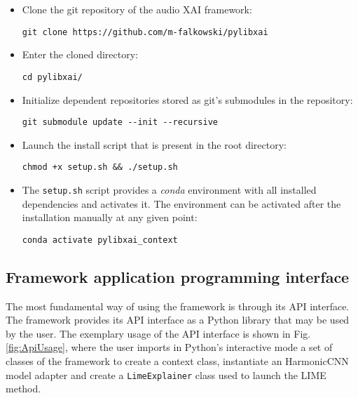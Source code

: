 \documentclass[
    bindingoffset=5mm,  %
    footnoteindent=3mm, %
    hyphenation=true    %
]{src/wut-thesis}
\begin{document}
\begin{itemize}
    \item Clone the git repository of the audio XAI framework:
\begin{verbatim}
git clone https://github.com/m-falkowski/pylibxai
\end{verbatim}
    \item Enter the cloned directory:
\begin{verbatim}
cd pylibxai/
\end{verbatim}
    \item Initialize dependent repositories stored as git's submodules in the repository:
\begin{verbatim}
git submodule update --init --recursive
\end{verbatim}
    \item Launch the install script that is present in the root directory:
\begin{verbatim}
chmod +x setup.sh && ./setup.sh
\end{verbatim}
    \item The \texttt{setup.sh} script provides a \emph{conda} environment with all installed dependencies and activates it. The environment can be activated after the installation manually at any given point:
\begin{verbatim}
conda activate pylibxai_context
\end{verbatim}
\end{itemize}

\subsection{Framework application programming interface}

The most fundamental way of using the framework is through its API interface.
The framework provides its API interface as a Python library that may be used
by the user. The exemplary usage of the API interface is shown in Fig. \ref{fig:ApiUsage},
where the user imports in Python's interactive mode a set of classes of the framework to create a
context class, instantiate an HarmonicCNN model adapter and create a \texttt{LimeExplainer} class
used to launch the LIME method.
\end{document}
